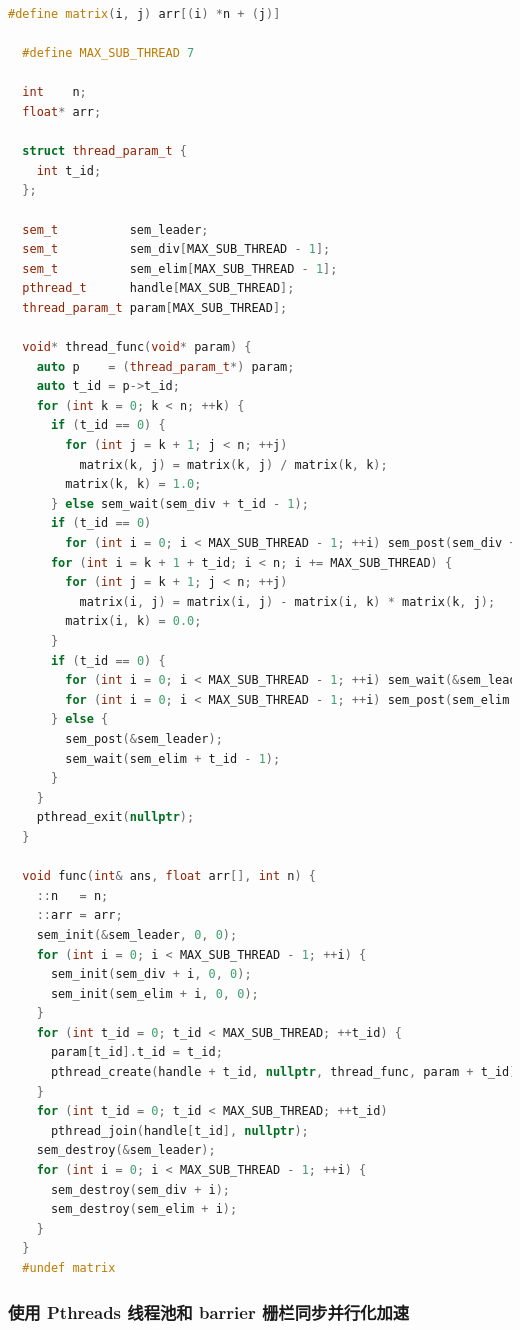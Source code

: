 \documentclass[a4paper]{article}
\begin{document}
\begin{lstlisting}[title=线程池+信号量同步+工作线程执行除法,frame=trbl,language={C++}]
  #define matrix(i, j) arr[(i) *n + (j)]

  #define MAX_SUB_THREAD 7

  int    n;
  float* arr;

  struct thread_param_t {
    int t_id;
  };

  sem_t          sem_leader;
  sem_t          sem_div[MAX_SUB_THREAD - 1];
  sem_t          sem_elim[MAX_SUB_THREAD - 1];
  pthread_t      handle[MAX_SUB_THREAD];
  thread_param_t param[MAX_SUB_THREAD];

  void* thread_func(void* param) {
    auto p    = (thread_param_t*) param;
    auto t_id = p->t_id;
    for (int k = 0; k < n; ++k) {
      if (t_id == 0) {
        for (int j = k + 1; j < n; ++j)
          matrix(k, j) = matrix(k, j) / matrix(k, k);
        matrix(k, k) = 1.0;
      } else sem_wait(sem_div + t_id - 1);
      if (t_id == 0)
        for (int i = 0; i < MAX_SUB_THREAD - 1; ++i) sem_post(sem_div + i);
      for (int i = k + 1 + t_id; i < n; i += MAX_SUB_THREAD) {
        for (int j = k + 1; j < n; ++j)
          matrix(i, j) = matrix(i, j) - matrix(i, k) * matrix(k, j);
        matrix(i, k) = 0.0;
      }
      if (t_id == 0) {
        for (int i = 0; i < MAX_SUB_THREAD - 1; ++i) sem_wait(&sem_leader);
        for (int i = 0; i < MAX_SUB_THREAD - 1; ++i) sem_post(sem_elim + i);
      } else {
        sem_post(&sem_leader);
        sem_wait(sem_elim + t_id - 1);
      }
    }
    pthread_exit(nullptr);
  }

  void func(int& ans, float arr[], int n) {
    ::n   = n;
    ::arr = arr;
    sem_init(&sem_leader, 0, 0);
    for (int i = 0; i < MAX_SUB_THREAD - 1; ++i) {
      sem_init(sem_div + i, 0, 0);
      sem_init(sem_elim + i, 0, 0);
    }
    for (int t_id = 0; t_id < MAX_SUB_THREAD; ++t_id) {
      param[t_id].t_id = t_id;
      pthread_create(handle + t_id, nullptr, thread_func, param + t_id);
    }
    for (int t_id = 0; t_id < MAX_SUB_THREAD; ++t_id)
      pthread_join(handle[t_id], nullptr);
    sem_destroy(&sem_leader);
    for (int i = 0; i < MAX_SUB_THREAD - 1; ++i) {
      sem_destroy(sem_div + i);
      sem_destroy(sem_elim + i);
    }
  }
  #undef matrix
\end{lstlisting}

\subsubsection{使用 Pthreads 线程池和 barrier 栅栏同步并行化加速}
\end{document}

